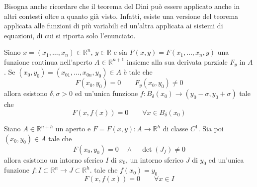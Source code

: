 Bisogna anche ricordare che il teorema del Dini può essere applicato anche in altri contesti oltre a quanto già visto. Infatti, esiste una versione del teorema applicata alle funzioni di più variabili ed un'altra applicata ai sistemi di equazioni, di cui si riporta solo l'enunciato.
\begin{theorem}
Siano $x=(x_1, \dots, x_n) \in \mathbb{R}^n$, $y \in \mathbb{R}$ e sia $F(x, y)=F(x_1, \dots, x_n, y)$ una funzione continua nell'aperto $A \in \mathbb{R}^{n+1}$ insieme alla sua derivata parziale $F_y$ in $A$. Se $(x_0, y_0)=(x_{01}, \dots, x_{0n}, y_0)\in A$ è tale che
\begin{equation}
    F(x_0, y_0)=0 \qquad F_y(x_0, y_0) \neq 0
\end{equation}
allora esistono $\delta, \sigma>0$ ed un'unica funzione $f: B_\delta(x_0) \to (y_0-\sigma, y_0+ \sigma)$ tale che 
\begin{equation}
    F(x, f(x))=0 \qquad \forall x \in B_\delta(x_0)
\end{equation}
\end{theorem}
\begin{theorem}
    Siano $A \in \mathbb{R}^{n+h}$ un aperto e $F=F(x,y): A \to \mathbb{R}^h$ di classe $C^1$. Sia poi $(x_0, y_0) \in A$ tale che
    \begin{equation}
        F(x_0, y_0)=0\quad \land \quad \det(J_f) \neq 0
    \end{equation}
    allora esistono un intorno sferico $I$ di $x_0$, un intorno sferico $J$ di $y_0$ ed un'unica funzione $f: I \subset \mathbb{R}^n \to J \subset\mathbb{R}^h$. tale che $f(x_0)=y_0$
    \begin{equation}
        F(x, f(x))=0 \qquad \forall x \in I
    \end{equation}
\end{theorem}

